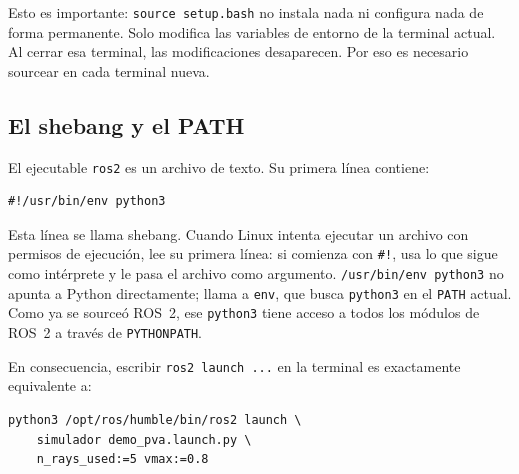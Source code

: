 Esto es importante: \texttt{source setup.bash} no instala nada ni configura nada de forma permanente. Solo modifica las variables de entorno de la terminal actual. Al cerrar esa terminal, las modificaciones desaparecen. Por eso es necesario sourcear en cada terminal nueva.

\subsection{El shebang y el PATH}

El ejecutable \texttt{ros2} es un archivo de texto. Su primera línea contiene:

\begin{lstlisting}[style=bash, caption={Primera línea del ejecutable \texttt{ros2}.}]
#!/usr/bin/env python3
\end{lstlisting}

Esta línea se llama shebang. Cuando Linux intenta ejecutar un archivo con permisos de ejecución, lee su primera línea: si comienza con \texttt{\#!}, usa lo que sigue como intérprete y le pasa el archivo como argumento. \texttt{/usr/bin/env python3} no apunta a Python directamente; llama a \texttt{env}, que busca \texttt{python3} en el \texttt{PATH} actual. Como ya se sourceó ROS~2, ese \texttt{python3} tiene acceso a todos los módulos de ROS~2 a través de \texttt{PYTHONPATH}.

En consecuencia, escribir \texttt{ros2 launch ...} en la terminal es exactamente equivalente a:

\begin{lstlisting}[style=bash, caption={Equivalencia entre el comando y su expansión real.}]
python3 /opt/ros/humble/bin/ros2 launch \
    simulador demo_pva.launch.py \
    n_rays_used:=5 vmax:=0.8
\end{lstlisting}
